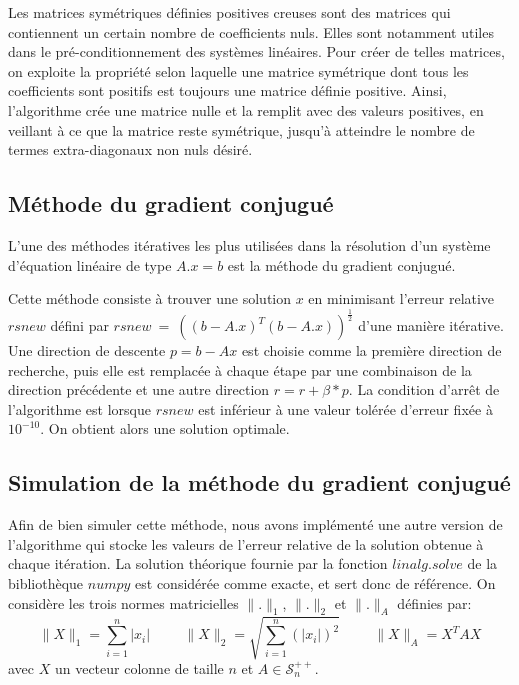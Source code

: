 \documentclass[a4paper]{article}
\begin{document}
Les matrices symétriques définies positives creuses sont des matrices qui contiennent un certain nombre de coefficients nuls. Elles sont notamment utiles dans le pré-conditionnement des systèmes linéaires. Pour créer de telles matrices, on exploite la propriété selon laquelle une matrice symétrique dont tous les coefficients sont positifs est toujours une matrice définie positive. Ainsi, l'algorithme crée une matrice nulle et la remplit avec des valeurs positives, en veillant à ce que la matrice reste symétrique, jusqu'à atteindre le nombre de termes extra-diagonaux non nuls désiré.


\subsection{Méthode du gradient conjugué}

L'une des méthodes itératives les plus utilisées dans la résolution d'un système d'équation linéaire de type $A.x = b$ est la méthode du gradient conjugué.


Cette méthode consiste à trouver une solution $x$ en minimisant l'erreur relative 
$rsnew$ défini par $rsnew~=~((b-A.x)^{T}(b-A.x))^{\frac{1}{2}}$ d'une manière itérative. Une direction de descente $p=b-Ax$ est choisie comme la première direction de recherche, puis elle est remplacée à chaque étape par une combinaison de la direction précédente et une autre direction $r=r+\beta*p$. La condition d'arrêt de l'algorithme est lorsque $rsnew$ est inférieur à une valeur tolérée d'erreur fixée à $10^{-10}$. On obtient alors une solution optimale.


\subsection{Simulation de la méthode du gradient conjugué}

Afin de bien simuler cette méthode, nous avons implémenté une autre version de l'algorithme qui stocke les valeurs de l'erreur relative de la solution obtenue à chaque itération. La solution théorique fournie par la fonction $linalg.solve$ de la bibliothèque $numpy$ est considérée comme exacte, et sert donc de référence. On considère les trois normes matricielles $\| . \|_{1}$, $\| . \|_{2}$ et $\| . \|_{A}$ définies par:
\[ \| X \|_{1} = \sum_{i=1}^{n} |x_{i}| \hspace{1cm}  \| X \|_{2} = \sqrt{\sum_{i=1}^{n} (|x_{i}|)^{2}} \hspace{1cm}  \| X \|_{A} =  X^{T}AX\]
avec $X$ un vecteur colonne de taille $n$ et $A \in \mathcal{S}_{n}^{++}$.
\end{document}
